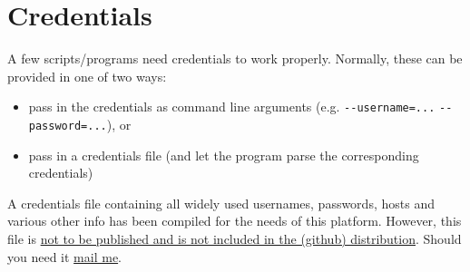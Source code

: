 \chapter{Credentials}
\label{ch:credentials}

A few scripts/programs need credentials to work properly. Normally, these can be 
provided in one of two ways:
\begin{itemize}
    \item pass in the credentials as command line arguments (e.g. \verb|--username=...| \verb|--password=...|), or 
    \item pass in a credentials file (and let the program parse the corresponding credentials)
\end{itemize}

A credentials file containing all widely used usernames, passwords, hosts and various 
other info has been compiled for the needs of this platform. However, this file is 
\ul{not to be published and is not included in the (github) distribution}. 
Should you need it \href{mailto:xanthos@mail.ntua.gr}{mail me}.